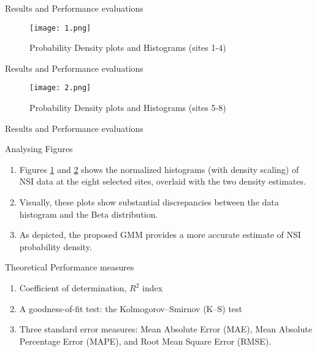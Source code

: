 \documentclass{beamer}
\begin{document}
\begin{frame}{Results and Performance evaluations }
    \begin{figure}
    \centering
    \texttt{[image: 1.png]}
    \caption{Probability Density plots and Histograms (sites 1-4)}
    \label{fig:1}
\end{figure}
\end{frame}
\begin{frame}{Results and Performance evaluations }
     \begin{figure}
    \centering
    \texttt{[image: 2.png]}
    \caption{Probability Density plots and Histograms (sites 5-8)}
    \label{fig:2}
\end{figure}
\end{frame}
\begin{frame}{Results and Performance evaluations }
\begin{block}{Analysing Figures}
    \begin{enumerate}
        \item Figures \ref{fig:1} and \ref{fig:2} shows the normalized histograms (with density scaling) of NSI data at the eight selected sites, overlaid with the two density estimates.
        \item Visually, these plots show substantial discrepancies between the data histogram and the Beta distribution.
\item  As depicted, the proposed GMM provides a more accurate estimate of NSI probability density.
    \end{enumerate}
\end{block}
     \begin{block}{Theoretical Performance measures}
    \begin{enumerate}
        \item Coefficient of determination, $R^2$ index
        \item A goodness-of-fit test: the Kolmogorov–Smirnov (K–S) test
\item Three standard error measures: Mean Absolute Error (MAE), Mean Absolute Percentage Error (MAPE), and Root Mean Square Error (RMSE). 
    \end{enumerate}
    \end{block}
\end{frame}
\end{document}
